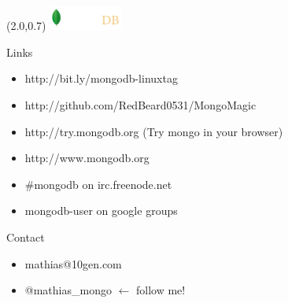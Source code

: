 \documentclass{beamer}
\newcommand{\MongoLogo}{
\begin{textblock}{14}(2.0,0.7)
  \includegraphics[height=0.8cm]{logo-mongodb-ondark.png}
\end{textblock}
}
\begin{document}
\begin{frame}
  \MongoLogo


  \begin{block}{Links}
  \begin{itemize}
    \item http://bit.ly/mongodb-linuxtag
    \item http://github.com/RedBeard0531/MongoMagic
    \item http://try.mongodb.org (Try mongo in your browser)
    \item http://www.mongodb.org
    \item \#mongodb on irc.freenode.net
    \item mongodb-user on google groups
  \end{itemize}
  \end{block}

  \begin{block}{Contact}
  \begin{itemize}
    \item mathias@10gen.com
    \item @mathias\_mongo ${\leftarrow}$ follow me!
  \end{itemize}
  \end{block}
\end{frame}
\end{document}
